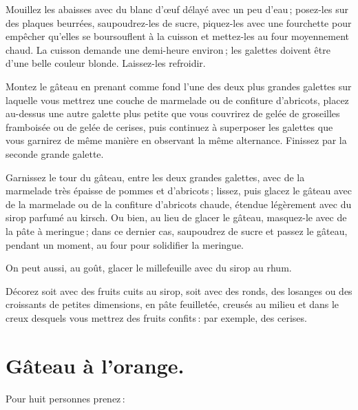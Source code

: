 Mouillez les abaisses avec du blanc d'œuf délayé avec un peu d'eau ; posez-les
sur des plaques beurrées, saupoudrez-les de sucre, piquez-les avec une
fourchette pour empêcher qu'elles se boursouflent à la cuisson et mettez-les au
four moyennement chaud. La cuisson demande une demi-heure environ ; les
galettes doivent être d'une belle couleur blonde. Laissez-les refroidir.

Montez le gâteau en prenant comme fond l'une des deux plus grandes galettes sur
laquelle vous mettrez une couche de marmelade ou de confiture d'abricots,
placez au-dessus une autre galette plus petite que vous couvrirez de gelée de
groseilles framboisée ou de gelée de cerises, puis continuez à superposer les
galettes que vous garnirez de même manière en observant la même alternance.
Finissez par la seconde grande galette.

Garnissez le tour du gâteau, entre les deux grandes galettes, avec de la
marmelade très épaisse de pommes et d'abricots ; lissez, puis glacez le gâteau
avec de la marmelade ou de la confiture d'abricots chaude, étendue légèrement
avec du sirop parfumé au kirsch. Ou bien, au lieu de glacer le gâteau,
masquez-le avec de la pâte à meringue ; dans ce dernier cas, saupoudrez de
sucre et passez le gâteau, pendant un moment, au four pour solidifier la
meringue.

On peut aussi, au goût, glacer le millefeuille avec du sirop au rhum.

Décorez soit avec des fruits cuits au sirop, soit avec des ronds, des losanges ou
des croissants de petites dimensions, en pâte feuilletée, creusés au milieu et dans
le creux desquels vous mettrez des fruits confits : par exemple, des cerises.

\section*{\centering Gâteau à l'orange.}
{}

Pour huit personnes prenez :

